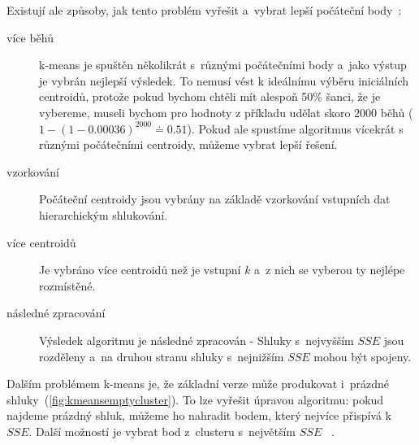 Existují ale způsoby, jak tento problém vyřešit a~vybrat lepší počáteční body~\cite{Tan05}:
\begin{description}
\item[více běhů] k-means je spuštěn několikrát s~různými počátečními body a~jako výstup je vybrán nejlepší výsledek. To nemusí vést k ideálnímu výběru iniciálních centroidů, protože pokud bychom chtěli mít alespoň 50\% šanci, že je vybereme, museli bychom pro hodnoty z příkladu udělat skoro 2000 běhů ($1 - (1 - 0.00036)^2000 \doteq 0.51$). Pokud ale spustíme algoritmus vícekrát s různými počátečními centroidy, můžeme vybrat lepší řešení.
\item[vzorkování] Počáteční centroidy jsou vybrány na základě vzorkování vstupních dat hierarchickým shlukování.
\item[více centroidů] Je vybráno více centroidů než je vstupní $k$ a~z nich se vyberou ty nejlépe rozmístěné.
\item[následné zpracování] Výsledek algoritmu je následné zpracován - Shluky s~nej\-vyš\-ším $SSE$ jsou rozděleny a~na druhou stranu shluky s~nejnižším $SSE$ mohou být spojeny.
\end{description} 

Dalším problémem k-means je, že základní verze může produkovat i~prázdné shluky~(\autoref{fig:kmeansemptycluster}). To lze vyřešit úpravou algoritmu: pokud najdeme prázdný shluk, můžeme ho nahradit bodem, který nejvíce přispívá k~$SSE$. Další možností je vybrat bod z~clusteru s~největším $SSE$ ~\cite{Tan05}.\\


